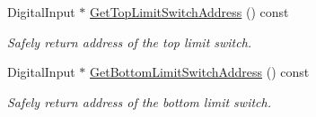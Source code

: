 \begin{DoxyCompactItemize}
DigitalInput $\ast$ \hyperlink{class_r_j_f_r_c2011_1_1_manipulator_a6dba7837dfa9ac7d5bce335b1a108846}{GetTopLimitSwitchAddress} () const 
\begin{DoxyCompactList}\small\item\em Safely return address of the top limit switch. \item\end{DoxyCompactList}\item 
DigitalInput $\ast$ \hyperlink{class_r_j_f_r_c2011_1_1_manipulator_ac81dd27510073450a5e741c7af963bb7}{GetBottomLimitSwitchAddress} () const 
\begin{DoxyCompactList}\small\item\em Safely return address of the bottom limit switch. \item\end{DoxyCompactList}\end{DoxyCompactItemize}
